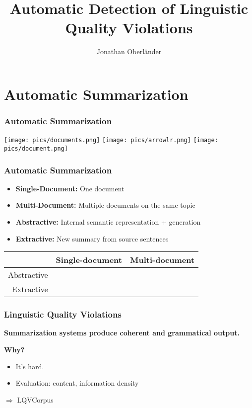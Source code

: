 \documentclass[table]{beamer}
\author{Jonathan Oberländer}
\title[Automatic Detection of LQ Violations\hspace{3em}\insertframenumber]{Automatic Detection of Linguistic Quality Violations} %
\date{}
\institute{Bachelor Thesis Defense\\Universität des Saarlandes\\21.08.2014}
\begin{document}
\maketitle

\section{Automatic Summarization}

\begin{frame}
  \frametitle{Automatic Summarization}
  \quad \quad \texttt{[image: pics/documents.png]} \texttt{[image: pics/arrowlr.png]} \texttt{[image: pics/document.png]}
\end{frame}

\begin{frame}
  \frametitle{Automatic Summarization}
  \begin{itemize}
    \item \textbf{Single-Document:} One document
    \item \textbf{Multi-Document:} Multiple documents on the same topic
  \end{itemize}
  \pause
  \begin{itemize}
    \item \textbf{Abstractive:} Internal semantic representation + generation
    \item \textbf{Extractive:} New summary from source sentences
  \end{itemize}
  \pause
  \vspace{1cm}

  \quad \quad \quad \begin{tabular}{r|c|c|}
    & Single-document & Multi-document\\
    \hline
    Abstractive & \cellcolor{red!25} & \cellcolor{red!25}\\
    \hline
    Extractive & \cellcolor{red!25} & \cellcolor{green!25}\\
    \hline
  \end{tabular}
\end{frame}

\begin{frame}
  \frametitle{Linguistic Quality Violations}
  \textbf{Summarization systems  produce coherent and grammatical output.}
  \pause

  \textbf{Why?}
  \begin{itemize}
    \item It's hard.\pause
    \item Evaluation: content, information density
  \end{itemize}
  \vspace{1cm}
  \pause
  $\Rightarrow$ LQVCorpus \citep{friedrichlqvsumm}


\end{frame}
\end{document}
